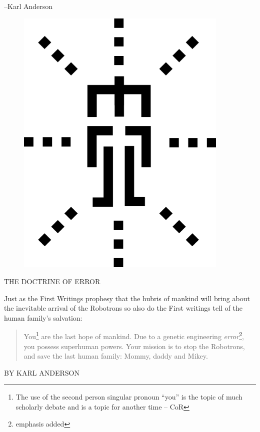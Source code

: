 \documentclass{amsbook}
\begin{document}
--Karl Anderson

\clearpage

\begin{figure}
  \includegraphics[width=4in]{mcor-logo11.png}
\end{figure}

\vskip 72pt

\clearpage
\vskip 72pt
{\ROBOFONTx   THE DOCTRINE OF ERROR}

\vskip 36pt

Just as the First Writings prophesy that the hubris of mankind will
bring about the inevitable arrival of the Robotrons so also do the
First writings tell of the human family's salvation:

\begin{quotation}
You\footnote{The use of the second person singular pronoun ``you'' is the topic
of much scholarly debate and is a topic for another time -- CoR} are
the last hope of mankind. Due to a genetic engineering {\em error}\footnote{
emphasis added}, you possess superhuman powers. Your mission is to
stop the Robotrons, and save the last human family: Mommy, daddy and
Mikey.
\end{quotation}

\clearpage

\vskip 36pt
{\ROBOFONTx BY KARL ANDERSON}
\vskip 36pt
\end{document}
